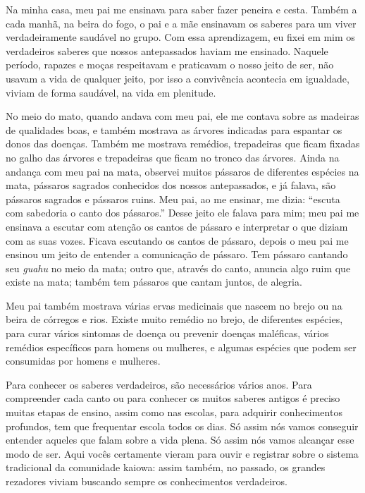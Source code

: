 Na minha casa, meu pai me ensinava para saber fazer peneira e cesta.
Também a cada manhã, na beira do fogo, o pai e a mãe ensinavam os
saberes para um viver verdadeiramente saudável no grupo. Com essa
aprendizagem, eu fixei em mim os verdadeiros saberes que nossos
antepassados haviam me ensinado. Naquele período, rapazes e moças
respeitavam e praticavam o nosso jeito de ser, não usavam a vida de
qualquer jeito, por isso a convivência acontecia em igualdade, viviam de
forma saudável, na vida em plenitude.

No meio do mato, quando andava com meu pai, ele me contava sobre as
madeiras de qualidades boas, e também mostrava as árvores indicadas para
espantar os donos das doenças. Também me mostrava remédios, trepadeiras
que ficam fixadas no galho das árvores e trepadeiras que ficam no tronco
das árvores. Ainda na andança com meu pai na mata, observei muitos
pássaros de diferentes espécies na mata, pássaros sagrados conhecidos
dos nossos antepassados, e já falava, são pássaros sagrados e pássaros
ruins. Meu pai, ao me ensinar, me dizia: ``escuta com sabedoria o canto
dos pássaros.'' Desse jeito ele falava para mim; meu pai me ensinava a
escutar com atenção os cantos de pássaro e interpretar o que diziam com
as suas vozes. Ficava escutando os cantos de pássaro, depois o meu pai
me ensinou um jeito de entender a comunicação de pássaro. Tem pássaro
cantando seu \emph{guahu} no meio da mata; outro que, através do canto,
anuncia algo ruim que existe na mata; também tem pássaros que cantam
juntos, de alegria.

Meu pai também mostrava várias ervas medicinais que nascem no brejo ou
na beira de córregos e rios. Existe muito remédio no brejo, de
diferentes espécies, para curar vários sintomas de doença ou prevenir
doenças maléficas, vários remédios específicos para homens ou mulheres,
e algumas espécies que podem ser consumidas por homens e mulheres.

Para conhecer os saberes verdadeiros, são necessários vários anos. Para
compreender cada canto ou para conhecer os muitos saberes antigos é
preciso muitas etapas de ensino, assim como nas escolas, para adquirir
conhecimentos profundos, tem que frequentar escola todos os dias. Só
assim nós vamos conseguir entender aqueles que falam sobre a vida plena.
Só assim nós vamos alcançar esse modo de ser. Aqui vocês certamente
vieram para ouvir e registrar sobre o sistema tradicional da comunidade
kaiowa: assim também, no passado, os grandes rezadores viviam buscando
sempre os conhecimentos verdadeiros.


